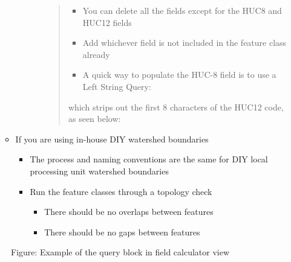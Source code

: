 \documentclass[letterpaper,10pt,english]{sphinxmanual}
\begin{document}
\begin{itemize}
\begin{itemize}
\begin{itemize}
\begin{itemize}
\begin{quote}
\begin{itemize}
\item {} 
You can delete all the fields except for the HUC8 and HUC12 fields

\item {} 
Add whichever field is not included in the feature class already

\item {} 
A quick way to populate the HUC-8 field is to use a Left String Query:

\begin{sphinxVerbatim}[commandchars=\\\{\}]
\PYG{p}{[}\PYG{p}{]}
\end{sphinxVerbatim}

\end{itemize}

which strips out the first 8 characters of the HUC12 code, as seen below:
\end{quote}

\end{itemize}

\end{itemize}

\item {} 
If you are using in-house DIY watershed boundaries
\begin{itemize}
\item {} 
The process and naming conventions are the same for DIY local processing unit watershed boundaries

\item {} 
Run the feature classes through a topology check
\begin{itemize}
\item {} 
There should be no overlaps between features

\item {} 
There should be no gaps between features

\end{itemize}

\end{itemize}

\end{itemize}

\end{itemize}

\begin{figure}[htbp]
\centering
\capstart

\noindent{}
\caption{Figure: Example of the query block in field calculator view}\label{\detokenize{ex_1:id5}}\end{figure}
\end{document}
